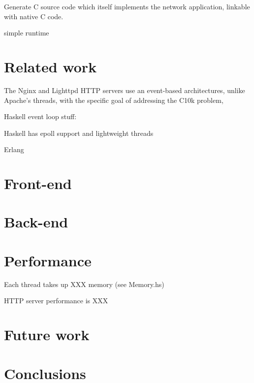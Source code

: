 \documentclass{article}
\begin{document}
Generate C source code which itself implements the network application, linkable
with native C code.

simple runtime

\section{Related work}

The Nginx\cite{Nginx} and Lighttpd\cite{Lighttpd} HTTP servers use an
event-based architectures, unlike Apache's threads\cite{Apache}, with the
specific goal of addressing the C10k problem,

Haskell event loop stuff: \cite{LiZdancewic}

Haskell has epoll support and lightweight threads

Erlang


\section{Front-end}

\section{Back-end}

\section{Performance}

Each thread takes up XXX memory (see Memory.hs)

HTTP server performance is XXX

\section{Future work}

\section{Conclusions}

{}

\end{document}
